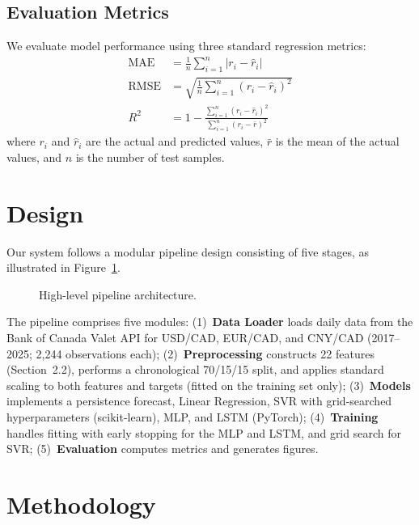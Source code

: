 \documentclass{article}
\begin{document}
\subsection{Evaluation Metrics}

We evaluate model performance using three standard regression metrics:
\begin{align}
  \text{MAE} &= \frac{1}{n}\sum_{i=1}^{n} |r_i - \hat{r}_i| \\
  \text{RMSE} &= \sqrt{\frac{1}{n}\sum_{i=1}^{n} (r_i - \hat{r}_i)^2} \\
  R^2 &= 1 - \frac{\sum_{i=1}^{n}(r_i - \hat{r}_i)^2}{\sum_{i=1}^{n}(r_i - \bar{r})^2}
\end{align}
where $r_i$ and $\hat{r}_i$ are the actual and predicted values, $\bar{r}$ is the mean of the actual values, and $n$ is the number of test samples.

	
\section{Design}

Our system follows a modular pipeline design consisting of five stages, as illustrated in Figure~\ref{fig:pipeline}.

\begin{figure}[!t]
  \centering
  \caption{High-level pipeline architecture.}
  \label{fig:pipeline}
\end{figure}

The pipeline comprises five modules: (1)~\textbf{Data Loader} loads daily data from the Bank of Canada Valet API for USD/CAD, EUR/CAD, and CNY/CAD (2017--2025; 2,244 observations each); (2)~\textbf{Preprocessing} constructs 22 features (Section~2.2), performs a chronological 70/15/15 split, and applies standard scaling to both features and targets (fitted on the training set only); (3)~\textbf{Models} implements a persistence forecast, Linear Regression, SVR with grid-searched hyperparameters (scikit-learn), MLP, and LSTM (PyTorch); (4)~\textbf{Training} handles fitting with early stopping for the MLP and LSTM, and grid search for SVR; (5)~\textbf{Evaluation} computes metrics and generates figures.


\section{Methodology}
\end{document}
